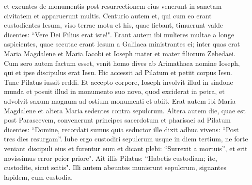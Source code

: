 \begin{biblechapter}
\verse et exeuntes de monumentis post resurrectionem eius venerunt in sanctam civitatem et apparuerunt multis. 
\verse Centurio autem et, qui cum eo erant custodientes Iesum, viso terrae motu et his, quae fiebant, timuerunt valde dicentes: “Vere Dei Filius erat iste!". 
\verse Erant autem ibi mulieres multae a longe aspicientes, quae secutae erant Iesum a Galilaea ministrantes ei; 
\verse inter quas erat Maria Magdalene et Maria Iacobi et Ioseph mater et mater filiorum Zebedaei. 
\verse Cum sero autem factum esset, venit homo dives ab Arimathaea nomine Ioseph, qui et ipse discipulus erat Iesu. 
\verse Hic accessit ad Pilatum et petiit corpus Iesu. Tunc Pilatus iussit reddi. 
\verse Et accepto corpore, Ioseph involvit illud in sindone munda 
\verse et posuit illud in monumento suo novo, quod exciderat in petra, et advolvit saxum magnum ad ostium monumenti et abiit.  
\verse Erat autem ibi Maria Magdalene et altera Maria sedentes contra sepulcrum. 
\verse Altera autem die, quae est post Parascevem, convenerunt principes sacerdotum et pharisaei ad Pilatum 
\verse dicentes: “Domine, recordati sumus quia seductor ille dixit adhuc vivens: “Post tres dies resurgam”. 
\verse Iube ergo custodiri sepulcrum usque in diem tertium, ne forte veniant discipuli eius et furentur eum et dicant plebi: “Surrexit a mortuis”, et erit novissimus error peior priore".  
\verse Ait illis Pilatus: “Habetis custodiam; ite, custodite, sicut scitis".  
\verse Illi autem abeuntes munierunt sepulcrum, signantes lapidem, cum custodia. 
\end{biblechapter}

